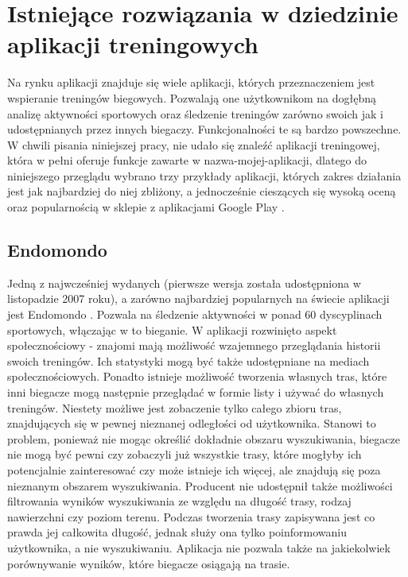 \section{Istniejące rozwiązania w dziedzinie aplikacji treningowych}
Na rynku aplikacji znajduje się wiele aplikacji, których przeznaczeniem jest wspieranie treningów biegowych. Pozwalają one użytkownikom na dogłębną analizę aktywności sportowych oraz śledzenie treningów zarówno swoich jak i udostępnianych przez innych biegaczy. Funkcjonalności te są bardzo powszechne. W chwili pisania niniejszej pracy, nie udało się znaleźć aplikacji treningowej, która w pełni oferuje funkcje zawarte w nazwa-mojej-aplikacji, dlatego do niniejszego przeglądu wybrano trzy przykłady aplikacji, których zakres działania jest jak najbardziej do niej zbliżony, a jednocześnie cieszących się wysoką oceną oraz popularnością w sklepie z aplikacjami Google Play \cite{googleplay}. 
\subsection{Endomondo}
Jedną z najwcześniej wydanych (pierwsze wersja została udostępniona w listopadzie 2007 roku), a zarówno najbardziej popularnych na świecie aplikacji jest Endomondo \cite{endomondo}.  Pozwala na śledzenie aktywności w ponad 60 dyscyplinach sportowych, włączając w to bieganie. W aplikacji rozwinięto aspekt społecznościowy - znajomi mają możliwość wzajemnego przeglądania historii swoich treningów. Ich statystyki mogą być także udostępniane na mediach społecznościowych. Ponadto istnieje możliwość tworzenia własnych tras, które inni biegacze mogą następnie przeglądać w formie listy i używać do własnych treningów. Niestety możliwe jest zobaczenie tylko całego zbioru tras, znajdujących się w pewnej nieznanej odległości od użytkownika. Stanowi to problem, ponieważ nie mogąc określić dokładnie obszaru wyszukiwania, biegacze nie mogą być pewni czy zobaczyli już wszystkie trasy, które mogłyby ich potencjalnie zainteresować czy może istnieje ich więcej, ale znajdują się poza nieznanym obszarem wyszukiwania. Producent nie udostępnił także możliwości filtrowania wyników wyszukiwania ze względu na długość trasy, rodzaj nawierzchni czy poziom terenu. Podczas tworzenia trasy zapisywana jest co prawda jej całkowita długość, jednak służy ona tylko poinformowaniu użytkownika, a nie wyszukiwaniu. Aplikacja nie pozwala także na jakiekolwiek porównywanie wyników, które biegacze osiągają na trasie.
